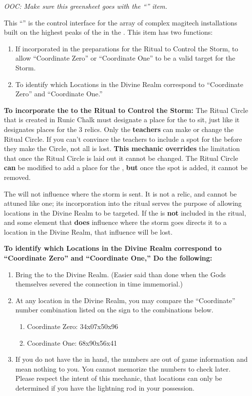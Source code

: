 \documentclass[green]{GL2020}
\begin{document}
\name{\gLightningRod{}}

\emph{OOC: Make sure this greensheet goes with the ``\iLightningRod{}'' item.}

This ``\iLightningRod{}'' is the control interface for the array of complex magitech installations built on the highest peaks of the \pSpine{} in the \pTech{}. This item has two functions: 

\begin{enumerate}
	\item If incorporated in the preparations for the Ritual to Control the Storm, to allow ``Coordinate Zero'' or ``Coordinate One'' to be a valid target for the Storm.
	\item To identify which Locations in the Divine Realm correspond to ``Coordinate Zero'' and ``Coordinate One.''
\end{enumerate}

\textbf{To incorporate the \iLightningRod{} to the Ritual to Control the Storm:} The Ritual Circle that is created in Runic Chalk must designate a place for the \iLightningRod{} to sit, just like it designates places for the 3 relics. Only the \textbf{teachers} can make or change the Ritual Circle. If you can't convince the teachers to include a spot for the \iLightningRod{} before they make the Circle, not all is lost. \textbf{This mechanic overrides} the limitation that once the Ritual Circle is laid out it cannot be changed. The Ritual Circle \textbf{can} be modified to add a place for the \iLightningRod{}, \textbf{but} once the spot is added, it cannot be removed.

The \iLightningRod{} will not influence where the storm is sent. It is not a relic, and cannot be attuned like one; its incorporation into the ritual serves the purpose of allowing locations in the Divine Realm to be targeted. If the \iLightningRod{} is \textbf{not} included in the ritual, and some element that \textbf{does} influence where the storm goes directs it to a location in the Divine Realm, that influence will be lost.

\textbf{To identify which Locations in the Divine Realm correspond to ``Coordinate Zero'' and ``Coordinate One,'' Do the following:}
\begin{enumerate}
	\item Bring the \iLightningRod{} to the Divine Realm. (Easier said than done when the Gods themselves severed the connection in time immemorial.)
	\item At any location in the Divine Realm, you may compare the ``Coordinate'' number combination listed on the sign to the combinations below.
	\begin{enumerate}
		\item Coordinate Zero: 34x07x50x96 
	\item Coordinate One: 68x90x56x41
	\end{enumerate}
	\item If you do not have the \iLightningRod{} in hand, the numbers are out of game information and mean nothing to you. You cannot memorize the numbers to check later. Please respect the intent of this mechanic, that locations can only be determined if you have the lightning rod in your possession.
\end{enumerate}
\end{document}
